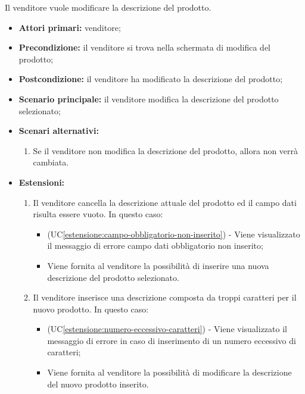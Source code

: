 Il venditore vuole modificare la descrizione del prodotto.
\begin{itemize}
    \item \textbf{Attori primari:} venditore;
    \item \textbf{Precondizione:} il venditore si trova nella schermata di modifica del prodotto;
    \item \textbf{Postcondizione:} il venditore ha modificato la descrizione del prodotto;
    \item \textbf{Scenario principale:} il venditore modifica la descrizione del prodotto selezionato;
    \item \textbf{Scenari alternativi:}
    \begin{enumerate}[label=\lett]
		\item Se il venditore non modifica la descrizione del prodotto, allora non verrà cambiata.
	\end{enumerate}
    \item \textbf{Estensioni:}
    \begin{enumerate}[label=\lett]
    	\item Il venditore cancella la descrizione attuale del prodotto ed il campo dati risulta essere vuoto. In questo caso:
    	\begin{itemize}
    		\item (UC\ref{estensione:campo-obbligatorio-non-inserito}) - Viene visualizzato il messaggio di errore campo dati obbligatorio non inserito;
    		\item Viene fornita al venditore la possibilità di inserire una nuova descrizione del prodotto selezionato.
    	\end{itemize}
        \item Il venditore inserisce una descrizione composta da troppi caratteri per il nuovo prodotto. In questo caso:
	    \begin{itemize}
    		\item (UC\ref{estensione:numero-eccessivo-caratteri}) - Viene visualizzato il messaggio di errore in caso di inserimento di un numero eccessivo di caratteri;
	    	\item Viene fornita al venditore la possibilità di modificare la descrizione del nuovo prodotto inserito.
	    \end{itemize}	
    \end{enumerate}
\end{itemize}

\label{modifica-prodotto.categorie}

